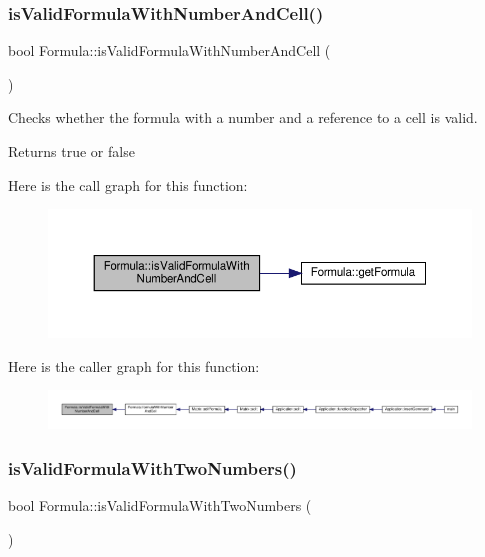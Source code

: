 \subsubsection{\texorpdfstring{is\+Valid\+Formula\+With\+Number\+And\+Cell()}{isValidFormulaWithNumberAndCell()}}
{\footnotesize\ttfamily bool Formula\+::is\+Valid\+Formula\+With\+Number\+And\+Cell (\begin{DoxyParamCaption}{ }\end{DoxyParamCaption})\hspace{0.3cm}{\ttfamily [private]}}

Checks whether the formula with a number and a reference to a cell is valid. \begin{DoxyReturn}{Returns}
true or false 
\end{DoxyReturn}
Here is the call graph for this function\+:
\nopagebreak
\begin{figure}[H]
\begin{center}
\leavevmode
\includegraphics[width=350pt]{class_formula_a83eff8c83a0ea79b3dd21c2e86a546c8_cgraph}
\end{center}
\end{figure}
Here is the caller graph for this function\+:
\nopagebreak
\begin{figure}[H]
\begin{center}
\leavevmode
\includegraphics[width=350pt]{class_formula_a83eff8c83a0ea79b3dd21c2e86a546c8_icgraph}
\end{center}
\end{figure}
\mbox{\label{class_formula_a0a2b13b0f741ea650e1ae71269dde9a5}} 
\subsubsection{\texorpdfstring{is\+Valid\+Formula\+With\+Two\+Numbers()}{isValidFormulaWithTwoNumbers()}}
{\footnotesize\ttfamily bool Formula\+::is\+Valid\+Formula\+With\+Two\+Numbers (\begin{DoxyParamCaption}{ }\end{DoxyParamCaption})\hspace{0.3cm}{\ttfamily [private]}}


